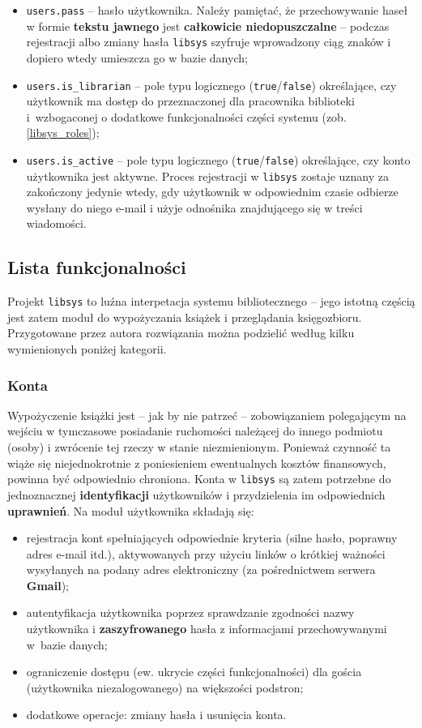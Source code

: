 \documentclass[12pt, a4paper]{article}
\begin{document}
\begin{itemize}
    \item \texttt{users.pass} -- hasło użytkownika. Należy pamiętać, że przechowywanie haseł w formie \textbf{tekstu jawnego} jest \textbf{całkowicie niedopuszczalne} -- podczas rejestracji albo zmiany hasła \texttt{libsys} szyfruje wprowadzony ciąg znaków i dopiero wtedy umieszcza go w bazie danych;
    \item \texttt{users.is\_librarian} -- pole typu logicznego (\texttt{true}/\texttt{false}) określające, czy użytkownik ma dostęp do przeznaczonej dla pracownika biblioteki i~wzbogaconej o dodatkowe funkcjonalności części systemu (zob. \ref{libsys_roles});
    \item \texttt{users.is\_active} -- pole typu logicznego (\texttt{true}/\texttt{false}) określające, czy konto użytkownika jest aktywne. Proces rejestracji w \texttt{libsys} zostaje uznany za zakończony jedynie wtedy, gdy użytkownik w odpowiednim czasie odbierze wysłany do niego e-mail i użyje odnośnika znajdującego się w treści wiadomości.
\end{itemize}

\subsection{Lista funkcjonalności}
Projekt \texttt{libsys} to luźna interpetacja systemu bibliotecznego -- jego istotną częścią jest zatem moduł do wypożyczania książek i przeglądania księgozbioru. Przygotowane przez autora rozwiązania można podzielić według kilku wymienionych poniżej kategorii.

\subsubsection{Konta}
Wypożyczenie książki jest -- jak by nie patrzeć -- zobowiązaniem polegającym na wejściu w tymczasowe posiadanie ruchomości należącej do innego podmiotu (osoby) i zwrócenie tej rzeczy w stanie niezmienionym. Ponieważ czynność ta wiąże się niejednokrotnie z poniesieniem ewentualnych kosztów finansowych, powinna być odpowiednio chroniona. Konta w \texttt{libsys} są zatem potrzebne do jednoznacznej \textbf{identyfikacji} użytkowników i przydzielenia im odpowiednich \textbf{uprawnień}. Na moduł użytkownika składają się:
\begin{itemize}
    \item rejestracja kont spełniających odpowiednie kryteria (silne hasło, poprawny adres e-mail itd.), aktywowanych przy użyciu linków o krótkiej ważności wysyłanych na podany adres elektroniczny (za pośrednictwem serwera \textbf{Gmail});
    \item autentyfikacja użytkownika poprzez sprawdzanie zgodności nazwy użytkownika i \textbf{zaszyfrowanego} hasła z informacjami przechowywanymi w~bazie danych;
    \item ograniczenie dostępu (ew. ukrycie części funkcjonalności) dla gościa (użytkownika niezalogowanego) na większości podstron;
    \item dodatkowe operacje: zmiany hasła i usunięcia konta.
\end{itemize}
\end{document}
